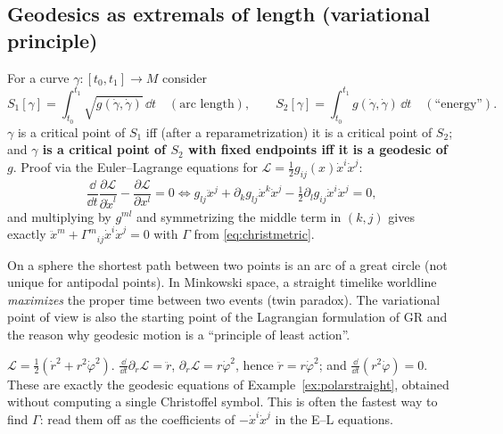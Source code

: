 \subsection{Geodesics as extremals of length (variational principle)}
\begin{formal}
For a curve $\gamma:[t_0,t_1]\to M$ consider
\[
S_1[\gamma]=\int_{t_0}^{t_1}\sqrt{g(\dot\gamma,\dot\gamma)}\,\dd t\quad(\text{arc length}),\qquad
S_2[\gamma]=\int_{t_0}^{t_1}g(\dot\gamma,\dot\gamma)\,\dd t\quad(\text{``energy''}).
\]
$\gamma$ is a critical point of $S_1$ iff (after a reparametrization) it is a critical point of $S_2$; and \textbf{$\gamma$ is a critical point of $S_2$ with fixed endpoints iff it is a geodesic of $g$}. Proof via the Euler--Lagrange equations for $\mathcal L=\tfrac12g_{ij}(x)\dot x^i\dot x^j$:
\[
\frac{\dd}{\dd t}\frac{\partial\mathcal L}{\partial\dot x^l}-\frac{\partial\mathcal L}{\partial x^l}=0\iff g_{lj}\ddot x^j+\partial_kg_{lj}\dot x^k\dot x^j-\tfrac12\partial_lg_{ij}\dot x^i\dot x^j=0,
\]
and multiplying by $g^{ml}$ and symmetrizing the middle term in $(k,j)$ gives exactly $\ddot x^m+\Gamma^m{}_{ij}\dot x^i\dot x^j=0$ with $\Gamma$ from \eqref{eq:christmetric}.
\end{formal}
\begin{intuition}
On a sphere the shortest path between two points is an arc of a great circle (not unique for antipodal points). In Minkowski space, a straight timelike worldline \emph{maximizes} the proper time between two events (twin paradox). The variational point of view is also the starting point of the Lagrangian formulation of GR and the reason why geodesic motion is a ``principle of least action''.
\end{intuition}

\begin{example}\label{ex:polarEL}
$\mathcal L=\tfrac12(\dot r^2+r^2\dot\varphi^2)$. $\frac{\dd}{\dd t}\partial_{\dot r}\mathcal L=\ddot r$, $\partial_r\mathcal L=r\dot\varphi^2$, hence $\ddot r=r\dot\varphi^2$; and $\frac{\dd}{\dd t}(r^2\dot\varphi)=0$. These are exactly the geodesic equations of Example~\ref{ex:polarstraight}, obtained without computing a single Christoffel symbol. This is often the fastest way to find $\Gamma$: read them off as the coefficients of $-\dot x^i\dot x^j$ in the E--L equations.
\end{example}

